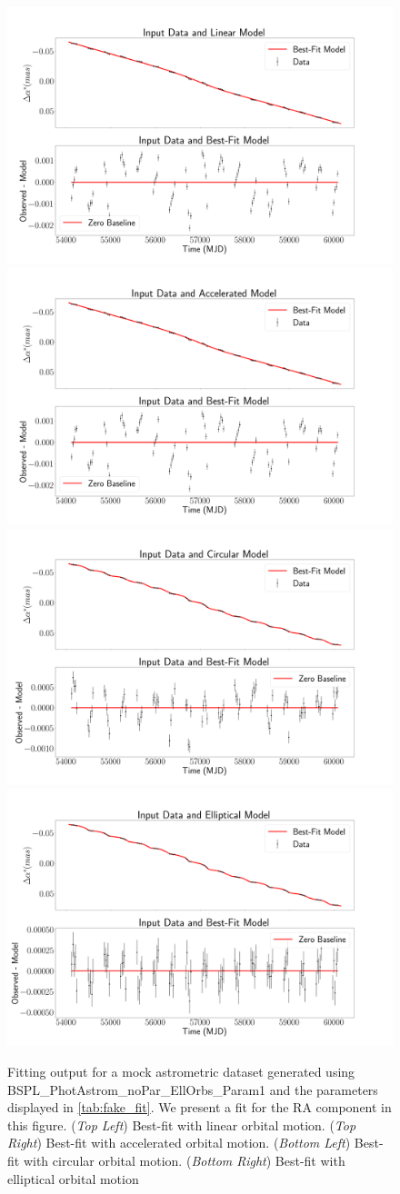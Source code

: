 \documentclass[twocolumn]{aastex701}
\begin{document}
\begin{figure}
    \centering
    \includegraphics[width= .48 \textwidth]{figures/LinAnalAst1.png}
    \includegraphics[width= .48 \textwidth]{figures/AccAnalAst1.png}
    \includegraphics[width= .48\textwidth]{figures/CircAnalAst1.png}
    \includegraphics[width= .48\textwidth]{figures/EllAnalAst1.png}

    \caption{Fitting output for a mock astrometric dataset generated using  BSPL\_PhotAstrom\_noPar\_EllOrbs\_Param1 and the parameters displayed in \autoref{tab:fake_fit}. We present a fit for the RA component in this figure. 
    (\emph{Top Left}) Best-fit with linear orbital motion. (\emph{Top Right}) Best-fit with accelerated orbital motion. (\emph{Bottom Left}) Best-fit with circular orbital motion. (\emph{Bottom Right}) Best-fit with elliptical orbital motion}
    \label{fig:orbital_comparison_as1}
\end{figure}
\end{document}
